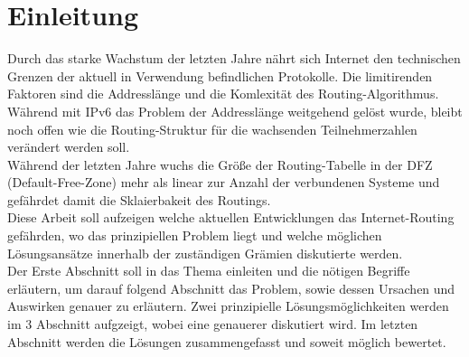 \section{Einleitung}
Durch das starke Wachstum der letzten Jahre nährt sich Internet den technischen Grenzen der aktuell in Verwendung befindlichen Protokolle. Die limitirenden Faktoren sind die Addresslänge und die Komlexität des Routing-Algorithmus. Während mit IPv6 das Problem der Addresslänge weitgehend gelöst wurde, bleibt noch offen wie die Routing-Struktur für die wachsenden Teilnehmerzahlen verändert werden soll. \\

Während der letzten Jahre wuchs die Größe der Routing-Tabelle in der DFZ (Default-Free-Zone) mehr als linear zur Anzahl der verbundenen Systeme und gefährdet damit die Sklaierbakeit des Routings. \\

Diese Arbeit soll aufzeigen welche aktuellen Entwicklungen das Internet-Routing gefährden, wo das prinzipiellen Problem liegt und welche möglichen Lösungsansätze innerhalb der zuständigen Grämien diskutierte werden. \\

Der Erste Abschnitt soll in das Thema einleiten und die nötigen Begriffe erläutern, um darauf folgend Abschnitt das Problem, sowie dessen Ursachen und Auswirken genauer zu erläutern. Zwei prinzipielle Lösungsmöglichkeiten werden im 3 Abschnitt aufgzeigt, wobei eine genauerer diskutiert wird. Im letzten Abschnitt werden die Lösungen zusammengefasst und soweit möglich bewertet.

 
